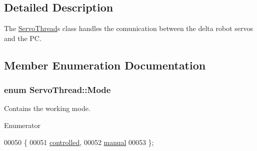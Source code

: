 \subsection{Detailed Description}
The \hyperlink{class_servo_thread}{Servo\+Thread}\textquotesingle{}s class handles the comunication between the delta robot servos and the P\+C. 



\subsection{Member Enumeration Documentation}
\hypertarget{class_servo_thread_a8d581034e60792a9995d44065f6140a5}{}
\subsubsection[{Mode}]{\setlength{\rightskip}{0pt plus 5cm}enum {\bf Servo\+Thread\+::\+Mode}}\label{class_servo_thread_a8d581034e60792a9995d44065f6140a5}


Contains the working mode. 

\begin{Desc}
\item[Enumerator]\par
\begin{description}
\item[{\em 
\hypertarget{class_servo_thread_a8d581034e60792a9995d44065f6140a5a6776147f492a4e0b0bb5ee4fdbc8d086}{}controlled\label{class_servo_thread_a8d581034e60792a9995d44065f6140a5a6776147f492a4e0b0bb5ee4fdbc8d086}
}]\item[{\em 
\hypertarget{class_servo_thread_a8d581034e60792a9995d44065f6140a5ae260aa6159d95b94851c96df939b51b3}{}manual\label{class_servo_thread_a8d581034e60792a9995d44065f6140a5ae260aa6159d95b94851c96df939b51b3}
}]\end{description}
\end{Desc}

\begin{DoxyCode}
00050     \{
00051         \hyperlink{class_servo_thread_a8d581034e60792a9995d44065f6140a5a6776147f492a4e0b0bb5ee4fdbc8d086}{controlled},
00052         \hyperlink{class_servo_thread_a8d581034e60792a9995d44065f6140a5ae260aa6159d95b94851c96df939b51b3}{manual}
00053     \};
\end{DoxyCode}
\hypertarget{class_servo_thread_aeccce0ac6a969e2ee7cbe91687e2d085}{}
